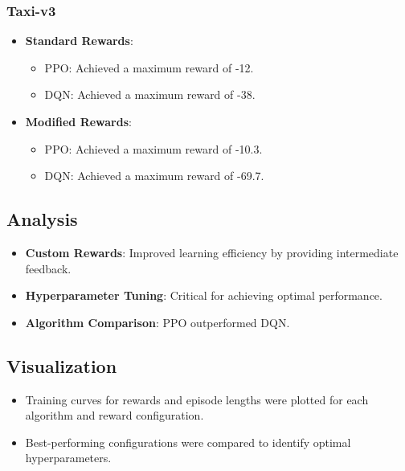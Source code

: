 \documentclass[12pt]{article}
\begin{document}
{{{\subsubsection*{Taxi-v3}
\begin{itemize}
    \item \textbf{Standard Rewards}:
    \begin{itemize}
        \item PPO: Achieved a maximum reward of -12.
        \item DQN: Achieved a maximum reward of -38.
    \end{itemize}
    \item \textbf{Modified Rewards}:
    \begin{itemize}
        \item PPO: Achieved a maximum reward of -10.3.
        \item DQN: Achieved a maximum reward of -69.7.
    \end{itemize}
\end{itemize}

\subsection*{Analysis}
\begin{itemize}
    \item \textbf{Custom Rewards}: Improved learning efficiency by providing intermediate feedback.
    \item \textbf{Hyperparameter Tuning}: Critical for achieving optimal performance.
    \item \textbf{Algorithm Comparison}: PPO outperformed DQN.
\end{itemize}

\subsection*{Visualization}
\begin{itemize}
    \item Training curves for rewards and episode lengths were plotted for each algorithm and reward configuration.
    \item Best-performing configurations were compared to identify optimal hyperparameters.
\end{itemize}

}}


\newpage

}
\end{document}
